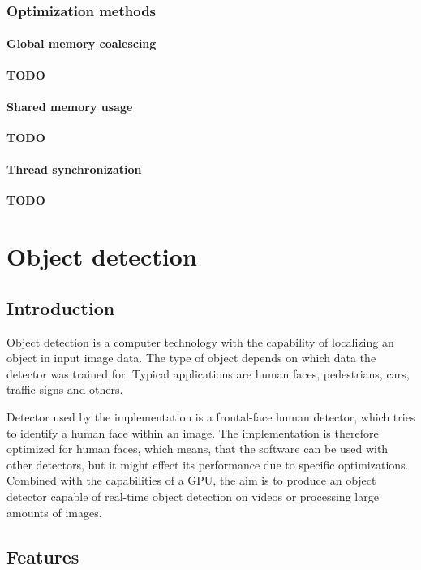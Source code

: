 \subsection{Optimization methods}

\subsubsection{Global memory coalescing}

\textbf{TODO}

\subsubsection{Shared memory usage}

\textbf{TODO}

\subsubsection{Thread synchronization}

\textbf{TODO}

\chapter{Object detection}

\section{Introduction}

Object detection is a computer technology with the capability of localizing an object in input image data. The type of object depends on which data the detector was trained for. Typical applications are human faces, pedestrians, cars, traffic signs and others.

Detector used by the implementation is a frontal-face human detector, which tries to identify a human face within an image. The implementation is therefore optimized for human faces, which means, that the software can be used with other detectors, but it might effect its performance due to specific optimizations. Combined with the capabilities of a GPU, the aim is to produce an object detector capable of real-time object detection on videos or processing large amounts of images.

\section{Features}

